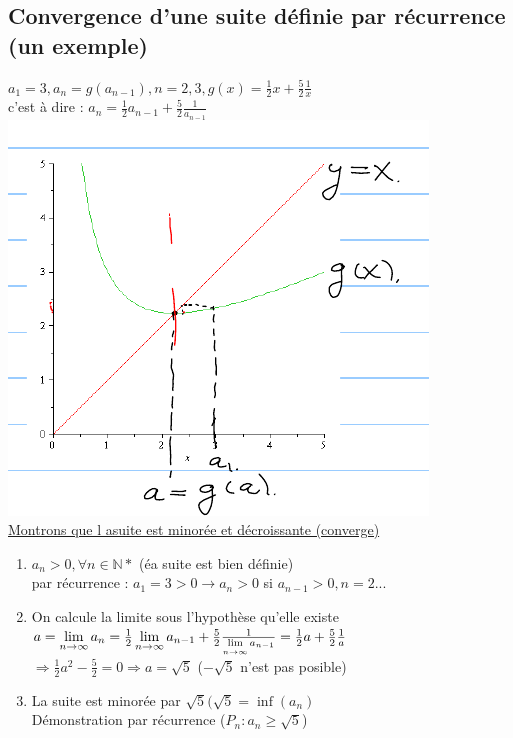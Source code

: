 \documentclass[12pt,a4paper]{article}
\begin{document}
{\subsection{Convergence d'une suite définie par récurrence (un exemple)}
$a_1 = 3, a_n = g(a_{n-1}), n = 2,3, g(x) = \frac{1}{2}x + \frac{5}{2}\frac{1}{x}$\\
c'est à dire : $a_n = \frac{1}{2} a_{n-1} + \frac{5}{2}\frac{1}{a_{n-1}}$\\
\includegraphics[scale=0.5]{illustrations_Analyse/suite_recurrence}\\
\underline{Montrons que l asuite est minorée et décroissante (converge)}
\begin{enumerate}
\item $a_n > 0, \forall n \in \mathbb{N*}$ (éa suite est bien définie)\\
par récurrence : $a_1 = 3  > 0 \to a_n > 0$ si $a_{n-1} > 0, n=2...$
\item On calcule la limite sous l'hypothèse qu'elle existe\\
$a = \lim\limits_{n \to \infty} a_n = \frac{1}{2} \lim\limits_{n \to \infty} a_{n-1} + \frac{5}{2} \frac{1}{\lim\limits_{n \to \infty} a_{n-1}} = \frac{1}{2} a  + \frac{5}{2}\frac{1}{a}$\\
$\Rightarrow \frac{1}{2}a^2 - \frac{5}{2} = 0 \Rightarrow a = \sqrt{5}$ ($-\sqrt{5}$ n'est pas posible)
\item La suite est minorée par $\sqrt{5} (\sqrt{5} = \inf(a_n)$\\
Démonstration par récurrence ($P_n : a_n \geq \sqrt{5}$)
\begin{itemize}

\end{itemize}
\end{enumerate}}
\end{document}
